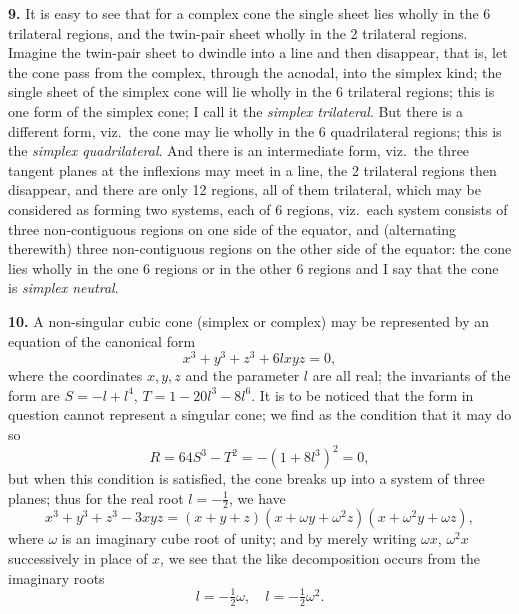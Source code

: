 \documentclass[11pt,a4paper]{article}
\begin{document}
\textbf{9.} It is easy to see that for a complex cone the single sheet lies wholly in the 6 trilateral regions, and the twin-pair sheet wholly in the 2 trilateral regions. Imagine the twin-pair sheet to dwindle into a line and then disappear, that is, let the cone pass from the complex, through the acnodal, into the simplex kind; the single sheet of the simplex cone will lie wholly in the 6 trilateral regions; this is one form of the simplex cone; I call it the \textit{simplex trilateral}. But there is a different form, viz.\ the cone may lie wholly in the 6 quadrilateral regions; this is the \textit{simplex quadrilateral}. And there is an intermediate form, viz.\ the three tangent planes at the inflexions may meet in a line, the 2 trilateral regions then disappear, and there are only 12 regions, all of them trilateral, which may be considered as forming two systems, each of 6 regions, viz.\ each system consists of three non-contiguous regions on one side of the equator, and (alternating therewith) three non-contiguous regions on the other side of the equator: the cone lies wholly in the one 6 regions or in the other 6 regions and I say that the cone is \textit{simplex neutral}.

\textbf{10.} A non-singular cubic cone (simplex or complex) may be represented by an equation of the canonical form
\[
x^{3} + y^{3} + z^{3} + 6lxyz = 0,
\]
where the coordinates $x, y, z$ and the parameter $l$ are all real; the invariants of the form are $S = -l + l^{4}$, $T = 1 - 20l^{3} - 8l^{6}$. It is to be noticed that the form in question cannot represent a singular cone; we find as the condition that it may do so
\[
R = 64S^{3} - T^{2} = -(1 + 8l^{3})^{2} = 0,
\]
but when this condition is satisfied, the cone breaks up into a system of three planes; thus for the real root $l = -\tfrac{1}{2}$, we have
\[
x^{3} + y^{3} + z^{3} - 3xyz = (x + y + z)(x + \omega y + \omega^{2} z)(x + \omega^{2} y + \omega z),
\]
where $\omega$ is an imaginary cube root of unity; and by merely writing $\omega x$, $\omega^{2} x$ successively in place of $x$, we see that the like decomposition occurs from the imaginary roots
\[
l = -\tfrac{1}{2}\omega,\quad l = -\tfrac{1}{2}\omega^{2}.
\]
\end{document}
